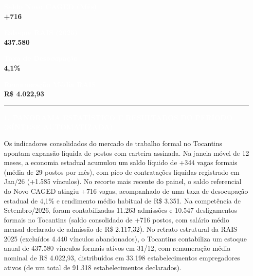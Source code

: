 \documentclass[10pt,a4paper]{article}
\newcommand{\secaojornal}[1]{%
  \vspace{6pt}%
  {\noindent\colorbox{azulto}{%
    \parbox{\dimexpr\textwidth-2\fboxsep\relax}{%
      \vspace{3pt}\hspace{4pt}\textcolor{douradoto}{\rule{7pt}{7pt}}\hspace{6pt}%
      \textcolor{white}{\textbf{\normalsize \MakeUppercase{#1}}}\vspace{3pt}%
    }%
  }}%
  \vspace{4pt}%
}
\begin{document}
\vspace{4pt}

\noindent\colorbox{azulto}{\parbox[t][1.32cm][c]{0.225\textwidth}{\centering\scriptsize\textcolor{white}{\textbf{Saldo Novo CAGED (Mês)}}\\[3pt]{\large\textbf{\textcolor{douradoto}{+716}}}}}\hfill\colorbox{azulto}{\parbox[t][1.32cm][c]{0.225\textwidth}{\centering\scriptsize\textcolor{white}{\textbf{Estoque RAIS (2025)}}\\[3pt]{\large\textbf{\textcolor{douradoto}{437.580}}}}}\hfill\colorbox{azulto}{\parbox[t][1.32cm][c]{0.225\textwidth}{\centering\scriptsize\textcolor{white}{\textbf{Taxa de Desocupação}}\\[3pt]{\large\textbf{\textcolor{douradoto}{4,1\%}}}}}\hfill\colorbox{azulto}{\parbox[t][1.32cm][c]{0.225\textwidth}{\centering\scriptsize\textcolor{white}{\textbf{Remuneração Média RAIS}}\\[3pt]{\large\textbf{\textcolor{douradoto}{R\$ 4.022,93}}}}}
\vspace{5pt}


\secaojornal{1. Panorama Estatístico e Resultados do Período (Síntese Automatizada)}

Os indicadores consolidados do mercado de trabalho formal no Tocantins apontam expansão líquida de postos com carteira assinada. Na janela móvel de 12 meses, a economia estadual acumulou um saldo líquido de +344 vagas formais (média de 29 postos por mês), com pico de contratações líquidas registrado em Jan/26 (+1.585 vínculos). No recorte mais recente do painel, o saldo referencial do Novo CAGED atingiu +716 vagas, acompanhado de uma taxa de desocupação estadual de 4,1\% e rendimento médio habitual de R\$ 3.351. Na competência de Setembro/2026, foram contabilizadas 11.263 admissões e 10.547 desligamentos formais no Tocantins (saldo consolidado de +716 postos, com salário médio mensal declarado de admissão de R\$ 2.117,32). No retrato estrutural da RAIS 2025 (excluídos 4.440 vínculos abandonados), o Tocantins contabiliza um estoque anual de 437.580 vínculos formais ativos em 31/12, com remuneração média nominal de R\$ 4.022,93, distribuídos em 33.198 estabelecimentos empregadores ativos (de um total de 91.318 estabelecimentos declarados).
\end{document}
